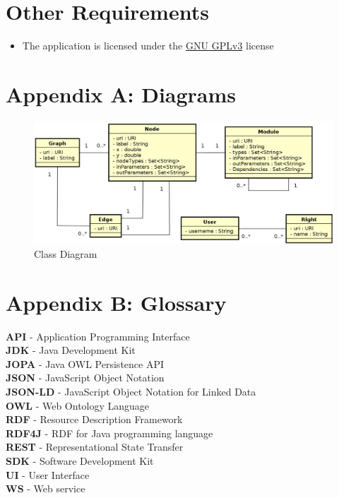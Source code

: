 \documentclass{article}
\begin{document}
	\section{Other Requirements}
	\begin{itemize}
	    \item The application is licensed under the \href{https://www.gnu.org/licenses/gpl.txt}{GNU GPLv3} license
	\end{itemize}
	\section*{Appendix A: Diagrams}
	\begin{figure}[h!]
	    \includegraphics[width=\textwidth]{ClassDiagram.png}
	    \caption{Class Diagram}
	\end{figure}
	\section*{Appendix B: Glossary}
	\textbf{API} - Application Programming Interface\\
	\textbf{JDK} - Java Development Kit\\
	\textbf{JOPA} - Java OWL Persistence API\\
	\textbf{JSON} - JavaScript Object Notation\\
	\textbf{JSON-LD} - JavaScript Object Notation for Linked Data\\
	\textbf{OWL} - Web Ontology Language\\
	\textbf{RDF} - Resource Description Framework\\
	\textbf{RDF4J} - RDF for Java programming language\\
	\textbf{REST} - Representational State Transfer\\
	\textbf{SDK} - Software Development Kit\\
	\textbf{UI} - User Interface\\
	\textbf{WS} - Web service
	\newpage
\end{document}

